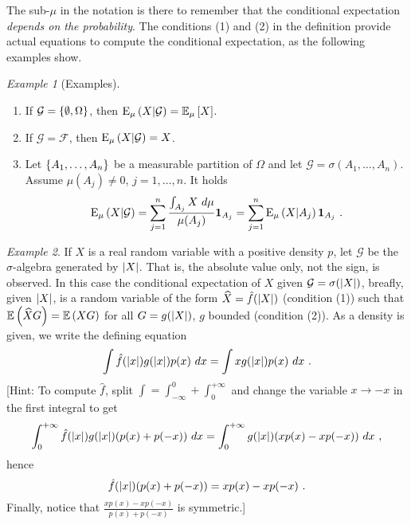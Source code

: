 \documentclass[12pt,a4paper]{amsart}
\newcommand{\one}{\bm 1}
\theoremstyle{plain}%
\theoremstyle{definition}
\theoremstyle{remark}
\newtheorem{example}{Example}
\begin{document}
The sub-$\mu$ in the notation is there to remember that the conditional expectation \emph{depends on the probability}. The conditions (1) and (2) in the definition provide actual equations to compute the conditional expectation, as the following examples show.

\begin{example}[Examples]
  \begin{enumerate}
  \item If $\mathcal G = \left\{\emptyset,\Omega\right\}$, then $\operatorname{E}_{\mu}\left(X \middle| \mathcal G\right) = \operatorname{\mathbb E}_{\mu}\left[X\right]$.
  \item If $\mathcal G = \mathcal F$, then $\operatorname{E}_{\mu}\left(X \middle| \mathcal G\right) = X$.
  \item Let $\left\{A_1, \dots, A_n\right\}$ be a measurable partition of $\Omega$ and let $\mathcal G = \sigma(A_1, \dots, A_n)$. Assume $\mu(A_j) \ne 0$, $j=1,\dots,n$. It holds
    \begin{equation*}
      \condexpat \mu X {\mathcal G} = \sum_{j=1}^n \frac{\int_{A_j} X \ d\mu}{\mu(A_j)} \one_{A_j} = \sum_{j=1}^n \condexpat \mu X {A_j} \one_{A_j} \ .
    \end{equation*}
\end{enumerate}
\end{example}

\begin{example}
If $X$ is a real random variable with a positive density $p$, let $\mathcal G$ be the $\sigma$-algebra generated by $\left\vert X\right\vert$. That is, the absolute value only, not the sign, is observed. In this case the conditional expectation of $X$ given $\mathcal G = \sigma(\left\vert X\right\vert)$, breafly, given $\left\vert X\right\vert$, is a random variable of the form $\widehat X = \hat f(\left\vert X\right\vert)$ (condition (1)) such that $\operatorname{\mathbb E}\left(\widehat X G\right) = \operatorname{\mathbb E}\left(XG\right)$ for all $G = g(\left\vert X\right\vert)$, $g$ bounded (condition (2)). As a density is given, we write the defining equation
\begin{equation*}
  \int \hat f(\left\vert x\right\vert) g(\left\vert x\right\vert) p(x) \ dx = \int x g(\left\vert x\right\vert) p(x) \ dx \ . 
\end{equation*}
[Hint: To compute $\hat f$, split $\int = \int_{-\infty}^0+\int_0^{+\infty}$ and change the variable $x \to -x$ in the first integral to get
\begin{equation*}
   \int_0^{+\infty} \hat f(\aval x) g(\aval x) (p(x)+p(-x)) \ dx = \int_0^{+\infty}  g(\aval x) (xp(x)-xp(-x)) \ dx \ , 
 \end{equation*}
hence
\begin{equation*}
  \hat f(\left\vert x\right\vert) (p(x)+p(-x)) = xp(x)-xp(-x) \ . 
 \end{equation*}
Finally, notice that $\frac{xp(x)-xp(-x)}{p(x)+p(-x)}$ is symmetric.]
\end{example}
\end{document}
